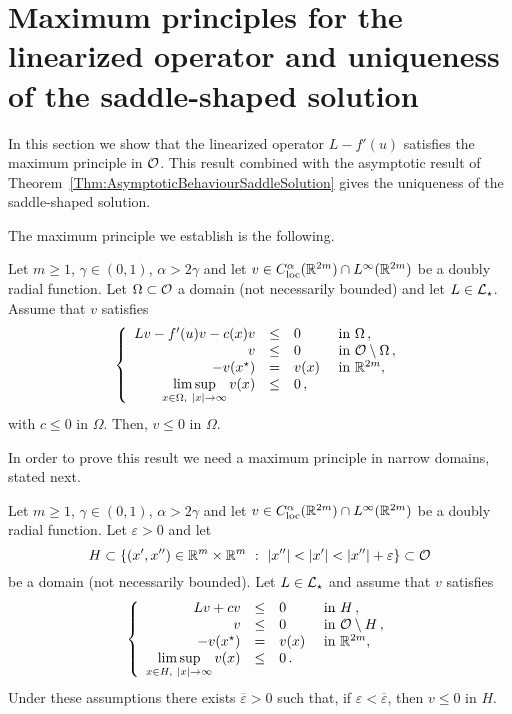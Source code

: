 \section{Maximum principles for the linearized operator and uniqueness of the saddle-shaped solution}
\label{Sec:MaximumPrinciple}

In this section we show that the linearized operator $L -f'(u)$ satisfies the maximum principle in $\mathcal{O}$. This result combined with the asymptotic result of Theorem~\ref{Thm:AsymptoticBehaviourSaddleSolution} gives the uniqueness of the saddle-shaped solution.

The maximum principle we establish is the following.

\begin{proposition}
	\label{Prop:MaximumPrincipleInO}
	Let $m\geq 1$, $\gamma \in (0,1)$, $\alpha > 2\gamma$ and let $v\in C^\alpha_{\mathrm{loc}}(\mathbb{R}^{2m})\cap L^\infty(\mathbb{R}^{2m})$ be a doubly radial function. Let $\Omega \subset \mathcal{O}$ a domain (not necessarily bounded) and let $L \in \mathcal{L}_\star$. Assume that $v$ satisfies
	$$
	\left\{\begin{array}{rcll}
	Lv - f'(u)v - c(x)v &\leq & 0 &\textrm{ in } \Omega\,,\\
	v &\leq & 0 &\textrm{ in } \mathcal{O} \setminus \Omega\,,\\
	- v(x^\star) & = & v(x) &\textrm{ in } \mathbb{R}^{2m},\\
	\displaystyle \limsup_{x\in \Omega, \ |x|\to \infty} v(x) &\leq & 0\,,
	\end{array} \right.
	$$
	with $c\leq 0$ in $\Omega$.
	Then, $v \leq 0$ in $\Omega$.
\end{proposition}

In order to prove this result we need a maximum principle in narrow domains, stated next.

\begin{proposition}
	\label{Prop:MaximumPrincipleNarrowDomainsOdd}
	Let $m\geq 1$, $\gamma \in (0,1)$, $\alpha > 2\gamma$ and let $v\in C^\alpha_{\mathrm{loc}}(\mathbb{R}^{2m})\cap L^\infty(\mathbb{R}^{2m})$ be a doubly radial function. Let $\varepsilon>0$ and let
	$$
	H \subset \{(x',x'')\in \R^m\times\R^m \ : \ |x''|<|x'|<|x''|+ \varepsilon\} \subset \ocal
	$$ 
	be a domain (not necessarily bounded). Let $L \in \mathcal{L}_\star$ and assume that $v$ satisfies
	\begin{equation}
	\label{Eq:AssumptionsMaxPNarrow}
	\left\{\begin{array}{rcll}
	Lv + cv&\leq & 0 &\textrm{ in } H\,,\\
	v &\leq & 0 &\textrm{ in } \mathcal{O} \setminus H\,,\\
	- v(x^\star) & = & v(x) &\textrm{ in } \mathbb{R}^{2m},\\
	\displaystyle \limsup_{x\in H, \ |x|\to \infty} v(x) &\leq & 0\,.
	\end{array} \right.
	\end{equation}
	Under these assumptions there exists $\overline{\varepsilon}>0$ such that, if $\varepsilon<\overline{\varepsilon}$, then $v \leq 0$ in $H$.
\end{proposition}

